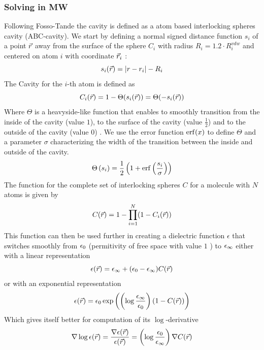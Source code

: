 \documentclass[../master_thesis.tex]{subfiles}
\begin{document}
\subsubsection{Solving in \ac{MW}}
Following Fosso-Tande \cite{FossoTande:2013ka} the cavity is defined as a atom
based interlocking spheres cavity (ABC-cavity). We start by defining a normal
signed distance function $s_i$ of a point $\vec{r}$ away from the surface of the
sphere $C_i$ with radius $R_i = 1.2\cdot R^{vdw}_i$ and centered on atom $i$ with
coordinate $\vec{r}_i$ \cite{FossoTande:2013ka}:
\begin{equation}
  s_i(\vec{r}) = \abs{r -r_i} - R_i
\end{equation}
The Cavity for the $i$-th atom is defined as
\begin{equation}
  C_i(\vec{r}) = 1 - \Theta(s_i(\vec{r})) =\Theta(-s_i(\vec{r}))
\end{equation}
Where $\Theta$ is a heavyside-like function that enables to smoothly transition
from the inside of the cavity (value $1$), to the surface of the cavity (value
$\frac{1}{2}$) and to the outside of the cavity (value $0$)
\cite{Sorland, FossoTande:2013ka}. We use the error function $\erf(x)$ to define
$\Theta$ and a parameter $\sigma$ characterizing the width of the transition
between the inside and outside of the cavity.
\begin{equation}
  \Theta\left(s_i\right) = \frac{1}{2}\left(1 + \erf\left(\frac{s_i}
  {\sigma}\right)\right)
\end{equation}
The function for the complete set of interlocking spheres $C$ for a molecule
with $N$ atoms is given by
\begin{equation}
  C(\vec{r}) = 1 - \prod_{i=1}^N(1 - C_i(\vec{r}))
\end{equation}
This function can then be used further in creating a dielectric function
$\epsilon$ that switches smoothly from $\epsilon_{0}$ (permitivity of free space
with value $1$ \cite{FossoTande:2013ka}) to $\epsilon_{\infty}$ either with a linear
representation
\begin{equation}
  \epsilon(\vec{r}) = \epsilon_{\infty}  + (\epsilon_{0} - \epsilon_{\infty})C(\vec{r})
\end{equation}
or with an exponential representation
\begin{equation}
  \epsilon(\vec{r}) =\epsilon_{0}\exp\left( \left(\log\frac{\epsilon_{\infty}}{\epsilon_{0}} \right)
  (1 - C(\vec{r})) \right)
\end{equation}
Which gives itself better for computation of its $\log$-derivative
\cite{FossoTande:2013ka}
\begin{equation}
  \nabla\log\epsilon(\vec{r}) = \frac{\nabla\epsilon(\vec{r})}{\epsilon(\vec{r})}
   = \left(\log\frac{\epsilon_{0}}{\epsilon_{\infty}} \right)\nabla C(\vec{r})
\end{equation}
\end{document}
